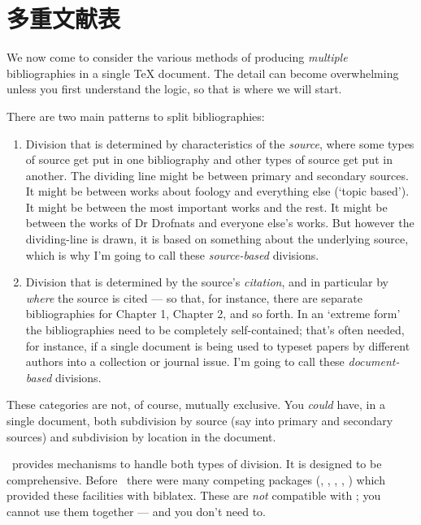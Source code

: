 \chapter{多重文献表}\label{ch:subdivisions}

We now come to consider the various methods of producing
\emph{multiple} bibliographies in a single TeX document. The detail
can become overwhelming unless you first understand the logic, so that
is where we will start.

There are two main patterns to split bibliographies:

\begin{enumerate}
\item Division that is determined by characteristics of the
  \emph{source}, where some types of source get put in one bibliography
  and other types of source get put in another. The dividing line
  might be between primary and secondary sources. It might be between
  works about foology and everything else (`topic based'). It might
  be between the most important works and the rest. It might be
  between the works of Dr Drofnats and everyone else's works. But
  however the dividing-line is drawn, it is based on something about
  the underlying source, which is why I'm going to call these
  \emph{source-based} divisions.
\item Division that is determined by the source's \emph{citation}, and
  in particular by \emph{where} the source is cited --- so that, for
  instance, there are separate bibliographies for Chapter 1, Chapter
  2, and so forth. In an `extreme form' the bibliographies need to
  be completely self-contained; that's often needed, for instance, if
  a single document is being used to typeset papers by different
  authors into a collection or journal issue. I'm going to call these
  \emph{document-based} divisions.
\end{enumerate}
These categories are not, of course, mutually exclusive. You
\emph{could} have, in a single document, both subdivision by source
(say into primary and secondary sources) and subdivision by location
in the document.

\biblatex\ provides mechanisms to handle both types of division. It is
designed to be comprehensive. Before \biblatex\ there were many
competing packages (, ,
, , ) which
provided these facilities with biblatex. These are \emph{not}
compatible with \biblatex; you cannot use them together --- and you
don't need to.

